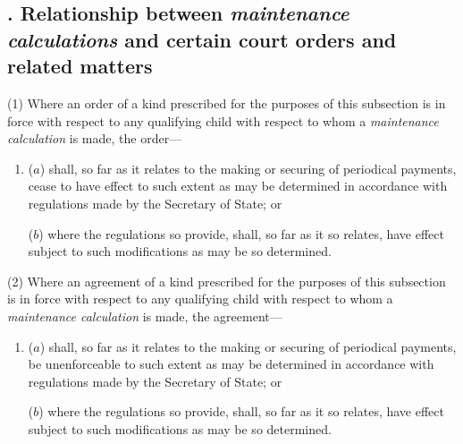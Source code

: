 \documentclass[12pt,a4paper]{article}
\begin{document}

\subsection[10. Relationship between 
\emph{maintenance calculations}  %
and certain court orders and related matters]{. Relationship between 
\emph{maintenance calculations}  %
and certain court orders and related matters}

(1) Where an order of a kind prescribed for the purposes of this subsection is in force with respect to any qualifying child with respect to whom a 
\emph{maintenance calculation}  %
is made, the order—
\begin{enumerate}\item[]
($a$) shall, so far as it relates to the making or securing of periodical payments, cease to have effect to such extent as may be determined in accordance with regulations made by the Secretary of State; or

($b$) where the regulations so provide, shall, so far as it so relates, have effect subject to such modifications as may be so determined.
\end{enumerate}

(2) Where an agreement of a kind prescribed for the purposes of this subsection is in force with respect to any qualifying child with respect to whom a 
\emph{maintenance calculation}  %
is made, the agreement—
\begin{enumerate}\item[]
($a$) shall, so far as it relates to the making or securing of periodical payments, be unenforceable to such extent as may be determined in accordance with regulations made by the Secretary of State; or

($b$) where the regulations so provide, shall, so far as it so relates, have effect subject to such modifications as may be so determined.
\end{enumerate}
\end{document}
